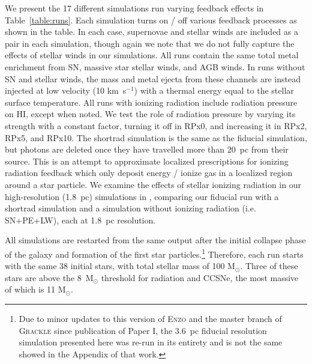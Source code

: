 \documentclass[twocolumn]{aastex62}
\newcommand{\methodpaper}{Paper I}
\newcommand{\HI}{HI}
\newcommand{\aje}[1]{\textcolor{blue}{\textbf{(AJE: #1)}}}
\begin{document}
We present the 17 different simulations run varying feedback effects in Table~\ref{table:runs}. Each simulation turns on / off various feedback processes as shown in the table. In each case, supernovae and stellar winds are included as a pair in each simulation, though again we note that we do not fully capture the effects of stellar winds in our simulations. All runs contain the same total metal enrichment from SN, massive star stellar winds, and AGB winds. In runs without SN and stellar winds, the mass and metal ejecta from these channels are instead injected at low velocity (10 km~s$^{-1}$) with a thermal energy equal to the stellar surface temperature. All runs with ionizing radiation include radiation pressure on \HI, except when noted. We test the role of radiation pressure by varying its strength with a constant factor, turning it off in RPx0, and increasing it in RPx2, RPx5, and RPx10. The shortrad simulation is the same as the fiducial simulation, but photons are deleted once they have travelled more than 20~pc from their source. This is an attempt to approximate localized prescriptions for ionizing radiation feedback which only deposit energy / ionize gas in a localized region around a star particle. We examine the effects of stellar ionizing radiation in our high-resolution (1.8~pc) simulations in \cite{Emerick2018a}, comparing our fiducial run with a shortrad simulation and a simulation without ionizing radiation (i.e. SN+PE+LW), each at 1.8~pc resolution.

All simulations are restarted from the same output after the initial collapse phase of the galaxy and formation of the first star particles.\footnote{Due to minor updates to this version of \textsc{Enzo} and the master branch of \textsc{Grackle} since publication of \methodpaper, the 3.6~pc fiducial resolution simulation presented here was re-run in its entirety and is not the same showed in the Appendix of that work.} Therefore, each run starts with the same 38 initial stars, with total stellar mass of 100 M$_{\odot}$. Three of these stars are above the 8~M$_{\odot}$ threshold for radiation and CCSNe, the most massive of which is 11 M$_{\odot}$.

\end{document}

